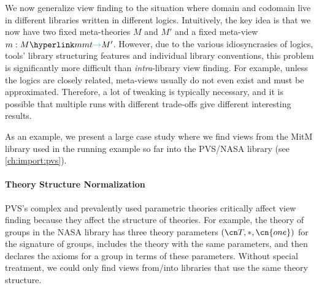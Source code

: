 \label{sec:normalizeinter}
We now generalize view finding to the situation where domain and codomain live in different libraries written in different logics.
Intuitively, the key idea is that we now have two fixed meta-theories $M$ and $M'$ and a fixed meta-view $m:\viewto M{M'}$.
However, due to the various idiosyncrasies of logics, tools' library structuring features and individual library conventions, this problem is significantly more difficult than \emph{intra}-library view finding.
For example, unless the logics are closely related, meta-views usually do not even exist and must be approximated.
Therefore, a lot of tweaking is typically necessary, and it is possible that multiple runs with different trade-offs give different interesting results.

As an example, we present a large case study where we find views from the MitM library used in the running example so far into the PVS/NASA library (see \autoref{ch:import:pvs}).


\paragraph{Theory Structure Normalization}
PVS's complex and prevalently used parametric theories critically affect view finding because they affect the structure of theories.
For example, the theory of groups  in the NASA library has three theory parameters $(\cn T,\ast,\cn{one})$ for the signature of groups, includes the theory  with the same parameters, and then declares the axioms for a group in terms of these parameters.
Without special treatment, we could only find views from/into libraries that use the same theory structure.

